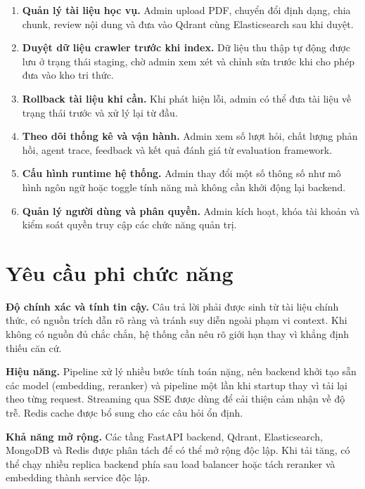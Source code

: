 \documentclass[../DoAn.tex]{subfiles}
\begin{document}
\begin{enumerate}[label=\textbf{A\arabic*.}]
    \item \textbf{Quản lý tài liệu học vụ.} Admin upload PDF, chuyển đổi
    định dạng, chia chunk, review nội dung và đưa vào Qdrant cùng
    Elasticsearch sau khi duyệt.

    \item \textbf{Duyệt dữ liệu crawler trước khi index.} Dữ liệu thu thập
    tự động được lưu ở trạng thái staging, chờ admin xem xét và chỉnh sửa
    trước khi cho phép đưa vào kho tri thức.

    \item \textbf{Rollback tài liệu khi cần.} Khi phát hiện lỗi, admin có
    thể đưa tài liệu về trạng thái trước và xử lý lại từ đầu.

    \item \textbf{Theo dõi thống kê và vận hành.} Admin xem số lượt hỏi,
    chất lượng phản hồi, agent trace, feedback và kết quả đánh giá từ
    evaluation framework.

    \item \textbf{Cấu hình runtime hệ thống.} Admin thay đổi một số thông
    số như mô hình ngôn ngữ hoặc toggle tính năng mà không cần khởi động
    lại backend.

    \item \textbf{Quản lý người dùng và phân quyền.} Admin kích hoạt, khóa
    tài khoản và kiểm soát quyền truy cập các chức năng quản trị.
\end{enumerate}

\section{Yêu cầu phi chức năng}

\textbf{Độ chính xác và tính tin cậy.} Câu trả lời phải được sinh từ tài liệu
chính thức, có nguồn trích dẫn rõ ràng và tránh suy diễn ngoài phạm vi
context. Khi không có nguồn đủ chắc chắn, hệ thống cần nêu rõ giới hạn thay
vì khẳng định thiếu căn cứ.

\textbf{Hiệu năng.} Pipeline xử lý nhiều bước tính toán nặng, nên backend
khởi tạo sẵn các model (embedding, reranker) và pipeline một lần khi startup
thay vì tải lại theo từng request. Streaming qua SSE được dùng để cải thiện
cảm nhận về độ trễ. Redis cache được bổ sung cho các câu hỏi ổn định.

\textbf{Khả năng mở rộng.} Các tầng FastAPI backend, Qdrant, Elasticsearch,
MongoDB và Redis được phân tách để có thể mở rộng độc lập. Khi tải tăng, có
thể chạy nhiều replica backend phía sau load balancer hoặc tách reranker và
embedding thành service độc lập.
\end{document}
